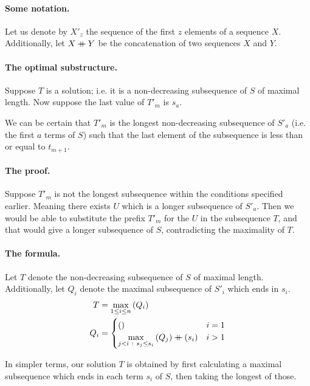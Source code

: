 \documentclass{article}
\begin{document}
\newcommand\concat{\mathbin{+\mkern-10mu+}}
\paragraph{Some notation.} Let us denote by \(X'_z\) the sequence of the first \(z\) elements of a sequence \(X\). Additionally, let \(X \concat Y\) be the concatenation of two sequences \(X\) and \(Y\).

\paragraph{The optimal substructure.} Suppose \(T\) is a solution; i.e. it is a non-decreasing subsequence of \(S\) of maximal length. Now suppose the last value of \(T'_m\) is \(s_a\).

We can be certain that \(T'_m\) is the longest non-decreasing subsequence of \(S'_a\) (i.e. the first \(a\) terms of \(S\)) such that the last element of the subsequence is less than or equal to \(t_{m+1}\).

\paragraph{The proof.} Suppose \(T'_m\) is not the longest subsequence within the conditions specified earlier. Meaning there exists \(U\) which is a longer subsequence of \(S'_a\). Then we would be able to substitute the prefix \(T'_m\) for the \(U\) in the subsequence \(T\), and that would give a longer subsequence of \(S\), contradicting the maximality of \(T\).

\paragraph{The formula.} Let \(T\) denote the non-decreasing subsequence of \(S\) of maximal length. Additionally, let \(Q_i\) denote the maximal subsequence of \(S'_i\) which ends in \(s_i\).
\begin{align*}
	T   & = \displaystyle\max_{1 \leq i \leq n} \left( Q_i \right) \\
	Q_i & =
	\begin{cases}
		()                                                                            & i = 1 \\
		\displaystyle\max_{j < i \ : \ s_j \leq s_i} \left( Q_j \right) \concat (s_i) & i > 1
	\end{cases}
\end{align*}

In simpler terms, our solution \(T\) is obtained by first calculating a maximal subsequence which ends in each term \(s_i\) of \(S\), then taking the longest of those.
\end{document}

